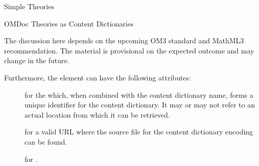 \begin{module}[id=theories]
\begin{omgroup}{Simple Theories}
\begin{omgroup}[id=identifying]{OMDoc Theories as Content Dictionaries}
\begin{oldpart}{The discussion here depends on the upcoming OM3 standard and MathML3
    recommendation. The material is provisional on the expected outcome and may change in
    the future.}
\begin{omtext}
Furthermore, the  element can have the following attributes:
\begin{description}
\item[] for the {} which, when
  combined with the content dictionary name, forms a unique identifier for the content
  dictionary. It may or may not refer to an actual location from which it can be
  retrieved.
\item[] for a valid URL where the source file for the content
  dictionary encoding can be found.
\item[] for .
\end{description}
\end{omtext}
\end{oldpart}
\end{omgroup}
\end{omgroup}
\end{module}

